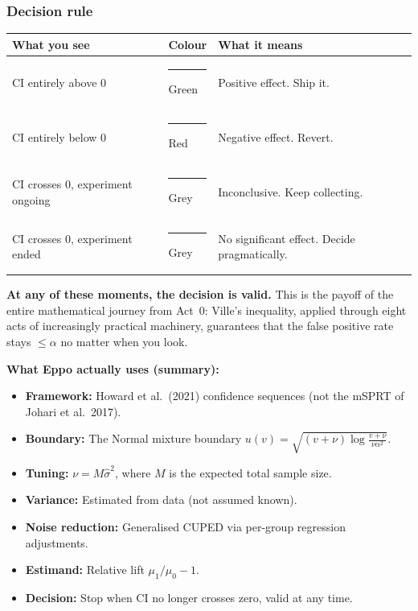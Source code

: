 \documentclass[12pt, a4paper]{article}
\begin{document}
\subsubsection*{Decision rule}

\begin{center}
\renewcommand{\arraystretch}{1.3}
\begin{tabular}{@{} l l p{6.5cm} @{}}
\toprule
\textbf{What you see} & \textbf{Colour} & \textbf{What it means} \\
\midrule
CI entirely above 0
  & \textcolor{green!60!black}{\rule{1em}{1em}} Green
  & Positive effect.  Ship it. \\
CI entirely below 0
  & \textcolor{red}{\rule{1em}{1em}} Red
  & Negative effect.  Revert. \\
CI crosses 0, experiment ongoing
  & \textcolor{gray}{\rule{1em}{1em}} Grey
  & Inconclusive.  Keep collecting. \\
CI crosses 0, experiment ended
  & \textcolor{gray}{\rule{1em}{1em}} Grey
  & No significant effect.  Decide pragmatically. \\
\bottomrule
\end{tabular}
\end{center}

\textbf{At any of these moments, the decision is valid.}  This is the payoff
of the entire mathematical journey from Act~0: Ville's inequality, applied
through eight acts of increasingly practical machinery, guarantees that the
false positive rate stays $\leq \alpha$ no matter when you look.

\begin{keytakeaway}
\textbf{What Eppo actually uses (summary):}
\begin{itemize}[nosep]
  \item \textbf{Framework:} Howard et al.\ (2021) confidence sequences
        (not the mSPRT of Johari et al.\ 2017).
  \item \textbf{Boundary:} The Normal mixture boundary
        $u(v) = \sqrt{(v+\nu)\log\frac{v+\nu}{\nu\alpha^2}}$.
  \item \textbf{Tuning:} $\nu = M \hat{\sigma}^2$, where $M$ is the expected
        total sample size.
  \item \textbf{Variance:} Estimated from data (not assumed known).
  \item \textbf{Noise reduction:} Generalised CUPED via per-group
        regression adjustments.
  \item \textbf{Estimand:} Relative lift $\mu_1/\mu_0 - 1$.
  \item \textbf{Decision:} Stop when CI no longer crosses zero, valid at any
        time.
\end{itemize}
\end{keytakeaway}
\end{document}
